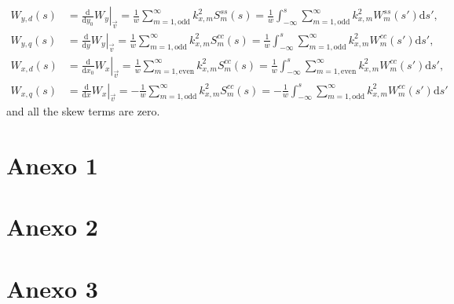 \documentclass[
	12pt,				%
	openright,			%
	oneside,			%
	a4paper,		%
	chapter=TITLE,		%
	section=TITLE,		%
    brazil,				%
	english,			%
	sumario=tradicional,
	]{abntex2}
\begin{document}
\begin{apendicesenv}
\begin{align}
W_{y,d}(s) &= \left.\frac{\mathrm{d}}{\mathrm{d}y_0}W_y\right|_{\vec{v}} = \frac1w\sum^\infty_{m=1,\mathrm{odd}} k_{x,m}^2 S^{ss}_m(s) = \frac1w\int_{-\infty}^s\sum^\infty_{m=1,\mathrm{odd}} k_{x,m}^2 W^{ss}_m(s') \mathrm{d}s',\\
W_{y,q}(s) &= \left.\frac{\mathrm{d}}{\mathrm{d}y}W_y\right|_{\vec{v}} = \frac1w\sum^\infty_{m=1,\mathrm{odd}} k_{x,m}^2 S^{cc}_m(s) = \frac1w\int_{-\infty}^s\sum^\infty_{m=1,\mathrm{odd}} k_{x,m}^2 W^{cc}_m(s') \mathrm{d}s', \\
W_{x,d}(s) &= \left.\frac{\mathrm{d}}{\mathrm{d}x_0}W_x\right|_{\vec{v}} = \frac1w\sum^\infty_{m=1,\mathrm{even}} k_{x,m}^2 S^{cc}_m(s) = \frac1w\int_{-\infty}^s\sum^\infty_{m=1,\mathrm{even}}k_{x,m}^2 W^{cc}_m(s') \mathrm{d}s', \\
W_{x,q}(s) &= \left.\frac{\mathrm{d}}{\mathrm{d}x}W_x\right|_{\vec{v}} = -\frac1w\sum^\infty_{m=1,\mathrm{odd}} k_{x,m}^2 S^{cc}_m(s) =-\frac1w\int_{-\infty}^s\sum^\infty_{m=1,\mathrm{odd}} k_{x,m}^2 W^{cc}_m(s') \mathrm{d}s'
\end{align}
and all the skew terms are zero.

\end{apendicesenv}


\begin{anexosenv}
\partanexos
\chapter{Anexo 1}
\lipsum[30]
\chapter{Anexo 2}
\lipsum[31]
\chapter{Anexo 3}
\lipsum[32]
\end{anexosenv}


\printindex

\printglossaries
\end{document}
